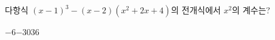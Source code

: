 다항식 $(x-1)^3-(x-2)(x^2+2x+4)$의 전개식에서 $x^2$의 계수는?
\begin{choices32}{$-6$}{$-3$}{$0$}{$3$}{$6$}\end{choices32}
